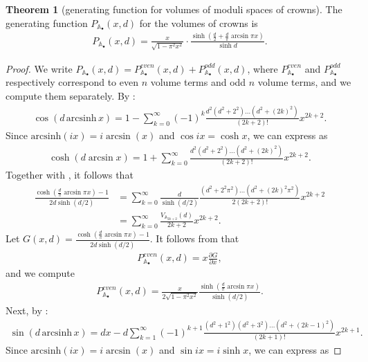 \documentclass{amsart}
\theoremstyle{definition}
\newtheorem{theorem}[proposition]{Theorem}
\begin{document}
\begin{theorem}[generating function for volumes of moduli spaces of crowns]
\label{prop:genfunction-crowns}
The generating function $P_{\mathbb{A}_{\bullet}}(x,d)$ for the volumes of crowns is
\begin{align}
P_{\mathbb{A}_{\bullet}}(x,d)
= 
\frac{x}{\sqrt{1-\pi^2x^2}} \cdot\frac{\sinh(\frac{d}{2}+\frac{d}{\pi}\arcsin\pi x)}{\sinh d}.
\end{align}
\end{theorem}
\begin{proof}
We write $P_{\mathbb{A}_{\bullet}}(x,d) = P_{\mathbb{A}_{\bullet}}^{even}(x,d)+P_{\mathbb{A}_{\bullet}}^{odd}(x,d)$, where $P_{\mathbb{A}_{\bullet}}^{even}$ and $P_{\mathbb{A}_{\bullet}}^{odd}$ respectively correspond to even $n$ volume terms and odd $n$ volume terms, and we compute them separately. By \cite[Equation~1.414(1)]{MR2360010}: 
\begin{align}
\label{eq:cos(arcsinh)}
\cos (d \,\text{arcsinh}\, {x}) = 1 - \sum_{k=0}^\infty (-1)^k \frac{d^2(d^2+2^2)\dotsc(d^2+(2k)^2)}{(2k+2)!} x^{2k+2}.
\end{align}
Since $\text{arcsinh}(ix)=i \arcsin(x)$ and $\cos  ix = \cosh x$, we can express  as
\begin{align}
\cosh (d \arcsin {x}) = 1 + \sum_{k=0}^\infty  \frac{d^2(d^2+2^2)\dotsc(d^2+(2k)^2)}{(2k+2)!} x^{2k+2}.
\end{align}
Together with , it follows that
\begin{equation}
\label{eq:G}
\begin{split}
\frac{\cosh \left(\frac{d}{\pi} \arcsin {\pi x}\right) -1}{2d\sinh(d/2)} &= \sum_{k=0}^\infty  \frac{d}{\sinh(d/2)}\frac{(d^2+2^2\pi^2)\dotsc(d^2+(2k)^2\pi^2)}{2(2k+2)!} x^{2k+2} 
\\&
= \sum_{k=0}^\infty  \frac{V_{\mathbb{A}_{2k+2}}(d)}{2k+2} x^{2k+2}.
\end{split}
\end{equation}
Let $G(x,d)= \frac{\cosh \left(\frac{d}{\pi} \arcsin {\pi x}\right) -1}{2d\sinh(d/2)}$. It follows from  that
\begin{align}
P_{\mathbb{A}_{\bullet}}^{even}(x,d)=x \frac{\partial G}{\partial x},  
\end{align}
and we compute
\begin{align}
\label{eq: P even}
P_{\mathbb{A}_{\bullet}}^{even}(x,d) = \frac{x}{2\sqrt{1-\pi^2x^2}} \frac{\sinh\left(\frac{d}{\pi} \arcsin {\pi x}\right)}{\sinh(d/2)}.   
\end{align}
Next, by \cite[Equation~1.414(2)]{MR2360010}: 
\begin{align}
\label{eq:sin(arcsinh)}
\sin (d \,\text{arcsinh}\, {x}) = dx - d\sum_{k=1}^\infty (-1)^{k+1} \frac{(d^2+1^2)(d^2+3^2)\dotsc(d^2+(2k-1)^2)}{(2k+1)!} x^{2k+1}.
\end{align}
Since $\text{arcsinh}(ix)=i \arcsin(x)$ and $\sin ix= i\sinh x $, we can express   as


\end{proof}
\end{document}
